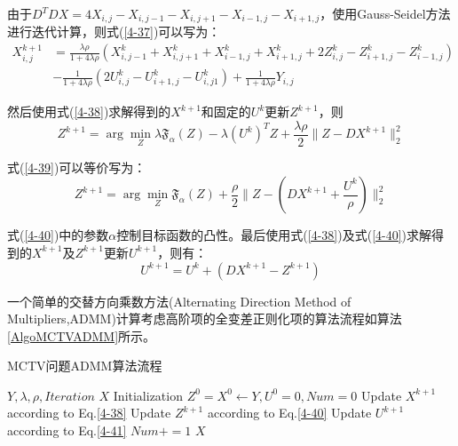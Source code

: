 \documentclass[12pt]{article}
\renewcommand{\algorithmicrequire}{\textbf{参数说明:}}
\renewcommand{\algorithmicensure}{\textbf{输出:}}
\begin{document}
\par
由于$D^T DX=4X_{i,j}-X_{i,j-1}-X_{i,j+1}-X_{i-1,j}-X_{i+1,j}$，使用Gauss-Seidel方法进行迭代计算，则式(\ref{4-37})可以写为：
\begin{equation}\label{4-38}
\begin{aligned}
X_{i,j}^{k+1}&=\frac{\lambda\rho}{1+4\lambda\rho}(X_{i,j-1}^k+X_{i,j+1}^k+X_{i-1,j}^k+X_{i+1,j}^k+2Z_{i,j}^k-Z_{i+1,j}^k-Z_{i-1,j}^k)\\
&-\frac{1}{1+4\lambda\rho}(2U_{i,j}^k-U_{i+1,j}^k-U_{i,j1}^k)+\frac{1}{1+4\lambda\rho}Y_{i,j}
\end{aligned}
\end{equation}
\par
然后使用式(\ref{4-38})求解得到的$X^{k+1}$和固定的$U^k$更新$Z^{k+1}$，则
\begin{equation}\label{4-39}
Z^{k+1}=\arg\min_Z \lambda\mathfrak{F}_\alpha(Z)-\lambda(U^k)^TZ+\frac{\lambda\rho}{2}\parallel Z-DX^{k+1} \parallel_2^2
\end{equation}
\par
式(\ref{4-39})可以等价写为：
\begin{equation}\label{4-40}
Z^{k+1}=\arg\min_Z \mathfrak{F}_\alpha(Z)+\frac{\rho}{2}\parallel Z-(DX^{k+1}+\frac{U^k}{\rho})\parallel_2^2
\end{equation}
\par
式(\ref{4-40})中的参数$\alpha$控制目标函数的凸性。最后使用式(\ref{4-38})及式(\ref{4-40})求解得到的$X^{k+1}$及$Z^{k+1}$更新$U^{k+1}$，则有：
\begin{equation}\label{4-41}
U^{k+1}=U^k+(DX^{k+1}-Z^{k+1})
\end{equation}
\par
一个简单的交替方向乘数方法(Alternating Direction Method of Multipliers,ADMM)计算考虑高阶项的全变差正则化项的算法流程如算法\ref{AlgoMCTVADMM}所示。
\begin{algorithm}[H]
\caption{MCTV问题ADMM算法流程}
\label{AlgoMCTVADMM}
\renewcommand{\algorithmicrequire}{\textbf{输入:}}
\renewcommand{\algorithmicensure}{\textbf{输出:}}
\begin{algorithmic}[1]
\Require
$Y,\lambda,\rho,Iteration$
\Ensure
$X$
\State Initialization $Z^0=X^0 \gets Y,U^0=0,Num=0$
\State Update $X^{k+1}$ according to Eq.\ref{4-38}
\State Update $Z^{k+1}$ according to Eq.\ref{4-40}
\State Update $U^{k+1}$ according to Eq.\ref{4-41}
\State $Num+=1$
\EndWhile
\State \Return $X$
\end{algorithmic}
\end{algorithm}
\end{document}
